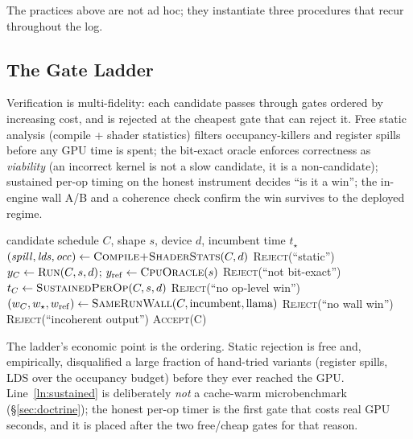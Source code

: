 \documentclass[11pt]{article}
\begin{document}
The practices above are not ad hoc; they instantiate three procedures that recur throughout the log.

\subsection{The Gate Ladder}
\label{sec:gateladder}

Verification is multi-fidelity: each candidate passes through gates ordered by increasing cost, and is
rejected at the cheapest gate that can reject it. Free static analysis (compile + shader statistics) filters
occupancy-killers and register spills before any GPU time is spent; the bit-exact oracle enforces
correctness as \emph{viability} (an incorrect kernel is not a slow candidate, it is a non-candidate);
sustained per-op timing on the honest instrument decides ``is it a win''; the in-engine wall A/B and a
coherence check confirm the win survives to the deployed regime.

\begin{algorithm}[h]
\caption{\textsc{GateLadder} --- multi-fidelity acceptance, cheapest rejection first}
\label{alg:gate}
\begin{algorithmic}[1]
\Require candidate schedule $C$, shape $s$, device $d$, incumbent time $t_\star$
\State $(\mathit{spill}, \mathit{lds}, \mathit{occ}) \gets \textsc{Compile+ShaderStats}(C, d)$ 
 \State \Return \textsc{Reject}(``static'') \EndIf
\State $y_C \gets \textsc{Run}(C, s, d)$; \; $y_{\mathrm{ref}} \gets \textsc{CpuOracle}(s)$
 \State \Return \textsc{Reject}(``not bit-exact'')  \EndIf
\State $t_C \gets \textsc{SustainedPerOp}(C, s, d)$  \label{ln:sustained}
 \State \Return \textsc{Reject}(``no op-level win'') \EndIf
\State $(w_C, w_\star, w_{\mathrm{ref}}) \gets \textsc{SameRunWall}(C, \text{incumbent}, \text{llama})$ 
 \State \Return \textsc{Reject}(``no wall win'') \EndIf
{} \State \Return \textsc{Reject}(``incoherent output'') \EndIf
\State \Return \textsc{Accept}(C) 
\end{algorithmic}
\end{algorithm}

The ladder's economic point is the ordering. Static rejection is free and, empirically, disqualified a
large fraction of hand-tried variants (register spills, LDS over the occupancy budget) before they ever
reached the GPU. Line~\ref{ln:sustained} is deliberately \emph{not} a cache-warm microbenchmark
(\S\ref{sec:doctrine}); the honest per-op timer is the first gate that costs real GPU seconds, and it is
placed after the two free/cheap gates for that reason.
\end{document}
